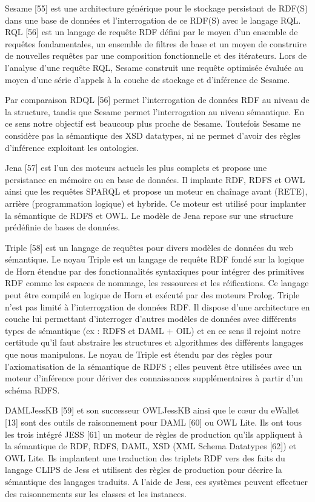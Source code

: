 Sesame [55] est une architecture générique pour le stockage persistant de RDF(S) dans une base de données et l'interrogation de ce RDF(S) avec le langage RQL. RQL [56] est un langage de requête RDF défini par le moyen d'un ensemble de requêtes fondamentales, un ensemble de filtres de base et un moyen de construire de nouvelles requêtes par une composition fonctionnelle et des itérateurs. Lors de l'analyse d’une requête RQL, Sesame construit une requête optimisée évaluée au moyen d'une série d'appels à la couche de stockage et d’inférence de Sesame.

Par comparaison RDQL [56] permet l'interrogation de données RDF au niveau de la structure, tandis que Sesame permet l’interrogation au niveau sémantique. En ce sens notre objectif est beaucoup plus proche de Sesame. Toutefois Sesame ne considère pas la sémantique des XSD datatypes, ni ne permet d’avoir des règles d'inférence exploitant les ontologies.

Jena [57] est l’un des moteurs actuels les plus complets et propose une persistance en mémoire ou en base de données. Il implante RDF, RDFS et OWL ainsi que les requêtes SPARQL et propose un moteur en chaînage avant (RETE), arrière (programmation logique) et hybride. Ce moteur est utilisé pour implanter la sémantique de RDFS et OWL. Le modèle de Jena repose sur une structure prédéfinie de bases de données.

Triple [58] est un langage de requêtes pour divers modèles de données du web sémantique. Le noyau Triple est un langage de requête RDF fondé sur la logique de Horn étendue par des fonctionnalités syntaxiques pour intégrer des primitives RDF comme les espaces de nommage, les ressources et les réifications. Ce langage peut être compilé en logique de Horn et exécuté par des moteurs Prolog. Triple n'est pas limité à l'interrogation de données RDF. Il dispose d'une architecture en couche lui permettant d'interroger d’autres modèles de données avec différents types de sémantique (ex : RDFS et DAML + OIL) et en ce sens il rejoint notre certitude qu’il faut abstraire les structures et algorithmes des différents langages que nous manipulons. Le noyau de Triple est étendu par des règles pour l’axiomatisation de la sémantique de RDFS ; elles peuvent être utilisées avec un moteur d'inférence pour dériver des connaissances supplémentaires à partir d'un schéma RDFS.

DAMLJessKB [59] et son successeur OWLJessKB ainsi que le cœur du eWallet [13] sont des outils de raisonnement pour DAML [60] ou OWL Lite. Ils ont tous les trois intégré JESS [61] un moteur de règles de production qu’ils appliquent à la sémantique de RDF, RDFS, DAML, XSD (XML Schema Datatypes [62]) et OWL Lite. Ils implantent une traduction des triplets RDF vers des faits du langage CLIPS de Jess et utilisent des règles de production pour décrire la sémantique des langages traduits. A l'aide de Jess, ces systèmes peuvent effectuer des raisonnements sur les classes et les instances.

